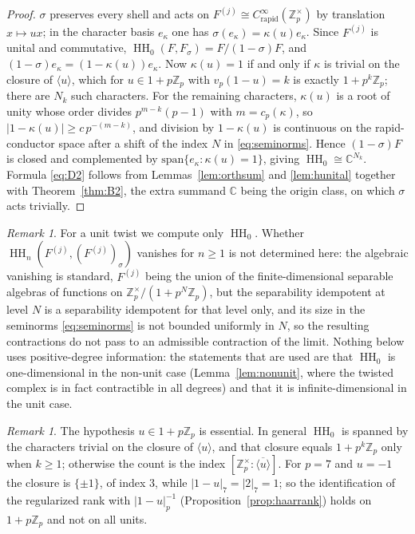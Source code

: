\documentclass[11pt]{amsart}
\theoremstyle{definition}
\theoremstyle{remark}
\newtheorem{remark}[theorem]{Remark}
\newcommand{\C}{\mathbb C}
\newcommand{\Z}{\mathbb Z}
\newcommand{\HH}{\operatorname{HH}}
\begin{document}
\begin{proof}
$\sigma$ preserves every shell and acts on $F^{(j)}\cong
C^{\infty}_{\mathrm{rapid}}(\Z_p^{\times})$ by translation $x\mapsto ux$; in
the character basis $e_{\kappa}$ one has $\sigma(e_{\kappa})=\kappa(u)
e_{\kappa}$.  Since $F^{(j)}$ is unital and commutative,
$\HH_0(F,F_{\sigma})=F/(1-\sigma)F$, and $(1-\sigma)e_{\kappa}=
(1-\kappa(u))e_{\kappa}$.  Now $\kappa(u)=1$ if and only if $\kappa$ is
trivial on the closure of $\langle u\rangle$, which for $u\in1+p\Z_p$ with
$v_p(1-u)=k$ is exactly $1+p^{k}\Z_p$; there are $N_k$ such characters.  For
the remaining characters, $\kappa(u)$ is a root of unity whose order divides
$p^{m-k}(p-1)$ with $m=c_p(\kappa)$, so $|1-\kappa(u)|\ge c\,p^{-(m-k)}$, and
division by $1-\kappa(u)$ is continuous on the rapid-conductor space after a
shift of the index $N$ in \eqref{eq:seminorms}.  Hence $(1-\sigma)F$ is closed
and complemented by $\mathrm{span}\{e_{\kappa}:\kappa(u)=1\}$, giving
$\HH_0\cong\C^{N_k}$.  Formula \eqref{eq:D2} follows from
Lemmas~\ref{lem:orthsum} and \ref{lem:hunital} together with
Theorem~\ref{thm:B2}, the extra summand $\C$ being the origin class, on which
$\sigma$ acts trivially.
\end{proof}

\begin{remark}\label{rem:higherdegrees}
For a unit twist we compute only $\HH_0$.  Whether
$\HH_n(F^{(j)},(F^{(j)})_{\sigma})$ vanishes for $n\ge1$ is not determined
here: the algebraic vanishing is standard, $F^{(j)}$ being the union of the
finite-dimensional separable algebras of functions on
$\Z_p^{\times}/(1+p^{N}\Z_p)$, but the separability idempotent at level $N$ is
a separability idempotent for that level only, and its size in the seminorms
\eqref{eq:seminorms} is not bounded uniformly in $N$, so the resulting
contractions do not pass to an admissible contraction of the limit.  Nothing
below uses positive-degree information: the statements that are used are that
$\HH_0$ is one-dimensional in the non-unit case (Lemma~\ref{lem:nonunit},
where the twisted complex is in fact contractible in all degrees) and that it
is infinite-dimensional in the unit case.
\end{remark}

\begin{remark}\label{rem:closure}
The hypothesis $u\in1+p\Z_p$ is essential.  In general $\HH_0$ is spanned by
the characters trivial on the closure of $\langle u\rangle$, and that closure
equals $1+p^{k}\Z_p$ only when $k\ge1$; otherwise the count is the index
$[\Z_p^{\times}:\overline{\langle u\rangle}]$.  For $p=7$ and $u=-1$ the
closure is $\{\pm1\}$, of index $3$, while $|1-u|_7=|2|_7=1$; so the
identification of the regularized rank with $|1-u|_p^{-1}$
(Proposition~\ref{prop:haarrank}) holds on $1+p\Z_p$ and not on all units.
\end{remark}
\end{document}

